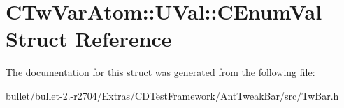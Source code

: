 \hypertarget{struct_c_tw_var_atom_1_1_u_val_1_1_c_enum_val}{\section{C\+Tw\+Var\+Atom\+:\+:U\+Val\+:\+:C\+Enum\+Val Struct Reference}
\label{struct_c_tw_var_atom_1_1_u_val_1_1_c_enum_val}
}


The documentation for this struct was generated from the following file\+:\begin{DoxyCompactItemize}
\item 
bullet/bullet-\/2.-\/r2704/\+Extras/\+C\+D\+Test\+Framework/\+Ant\+Tweak\+Bar/src/Tw\+Bar.\+h\end{DoxyCompactItemize}
